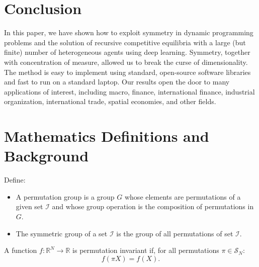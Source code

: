 \documentclass[12pt]{article}
\begin{document}
\section{Conclusion}\label{sec:conclusion}

In this paper, we have shown how to exploit symmetry in dynamic programming problems and the solution of recursive competitive equilibria with a large (but finite) number of heterogeneous agents using deep learning. Symmetry, together with concentration of measure, allowed us to break the curse of dimensionality. The method is easy to implement using standard, open-source software libraries and fast to run on a standard laptop. Our results open the door to many applications of interest, including macro, finance, international finance, industrial organization, international trade, spatial economies, and other fields.

\clearpage



\clearpage

\appendix

\makeatletter
\def\@seccntformat#1{Appendix\ \csname the#1\endcsname\quad}
\makeatother
\makeatletter
\def\@seccntformat#1{\csname Pref@#1\endcsname \csname the#1\endcsname\quad}
\def\Pref@section{Appendix~}
\makeatother
{}
	
\section{Mathematics Definitions and Background}\label{sec:math-background}

\begin{definition}\label{def:permutation-group}
Define:
\begin{itemize}
\item A permutation group is a group $G$ whose elements are permutations of a given set $\mathcal{I}$ and whose group operation is the composition of permutations in $G$.
\item The symmetric group of a set $\mathcal{I}$ is the group of all permutations of set $\mathcal{I}$.
\end{itemize}
\end{definition}	
	
\begin{definition} \label{def:permutation-invariance}
A function $f:\mathbb{R}^N\rightarrow \mathbb{R}$ is permutation invariant if, for all permutations $\pi \in \mathcal{S}_N$:
\begin{equation*}
f(\pi X) = f(X).
\end{equation*}
\end{definition}
	
\end{document}
